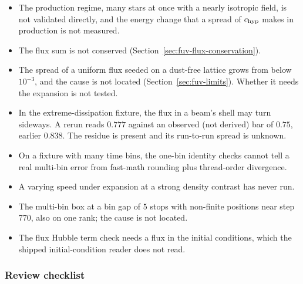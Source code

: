 \begin{itemize}
  \item The production regime, many stars at once with a nearly isotropic
    field, is not validated directly, and the energy change that a spread
    of $c_{\rm hyp}$ makes in production is not measured.
  \item The flux sum is not conserved
    (Section~\ref{sec:fuv-flux-conservation}).
  \item The spread of a uniform flux seeded on a dust-free lattice grows
    from below $10^{-3}$, and the cause is not located
    (Section~\ref{sec:fuv-limits}). Whether it needs the expansion is not
    tested.
  \item In the extreme-dissipation fixture, the flux in a beam's shell
    may turn sideways. A rerun reads $0.777$ against an observed (not
    derived) bar of $0.75$, earlier $0.838$. The residue is present and
    its run-to-run spread is unknown.
  \item On a fixture with many time bins, the one-bin identity checks
    cannot tell a real multi-bin error from fast-math rounding plus
    thread-order divergence.
  \item A varying speed under expansion at a strong density contrast has
    never run.
  \item The multi-bin box at a bin gap of $5$ stops with non-finite
    positions near step 770, also on one rank; the cause is not located.
  \item The flux Hubble term check needs a flux in the initial conditions,
    which the shipped initial-condition reader does not read.
\end{itemize}

\subsubsection{Review checklist}

